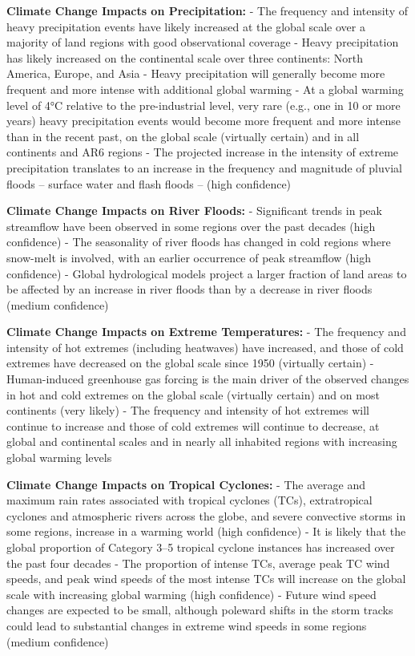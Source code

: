 \documentclass[
  letterpaper,
  DIV=11,
  numbers=noendperiod]{scrreprt}
\begin{document}
\textbf{Climate Change Impacts on Precipitation:} - The frequency and
intensity of heavy precipitation events have likely increased at the
global scale over a majority of land regions with good observational
coverage - Heavy precipitation has likely increased on the continental
scale over three continents: North America, Europe, and Asia - Heavy
precipitation will generally become more frequent and more intense with
additional global warming - At a global warming level of 4°C relative to
the pre-industrial level, very rare (e.g., one in 10 or more years)
heavy precipitation events would become more frequent and more intense
than in the recent past, on the global scale (virtually certain) and in
all continents and AR6 regions - The projected increase in the intensity
of extreme precipitation translates to an increase in the frequency and
magnitude of pluvial floods -- surface water and flash floods -- (high
confidence)

\textbf{Climate Change Impacts on River Floods:} - Significant trends in
peak streamflow have been observed in some regions over the past decades
(high confidence) - The seasonality of river floods has changed in cold
regions where snow-melt is involved, with an earlier occurrence of peak
streamflow (high confidence) - Global hydrological models project a
larger fraction of land areas to be affected by an increase in river
floods than by a decrease in river floods (medium confidence)

\textbf{Climate Change Impacts on Extreme Temperatures:} - The frequency
and intensity of hot extremes (including heatwaves) have increased, and
those of cold extremes have decreased on the global scale since 1950
(virtually certain) - Human-induced greenhouse gas forcing is the main
driver of the observed changes in hot and cold extremes on the global
scale (virtually certain) and on most continents (very likely) - The
frequency and intensity of hot extremes will continue to increase and
those of cold extremes will continue to decrease, at global and
continental scales and in nearly all inhabited regions with increasing
global warming levels

\textbf{Climate Change Impacts on Tropical Cyclones:} - The average and
maximum rain rates associated with tropical cyclones (TCs),
extratropical cyclones and atmospheric rivers across the globe, and
severe convective storms in some regions, increase in a warming world
(high confidence) - It is likely that the global proportion of Category
3--5 tropical cyclone instances has increased over the past four decades
- The proportion of intense TCs, average peak TC wind speeds, and peak
wind speeds of the most intense TCs will increase on the global scale
with increasing global warming (high confidence) - Future wind speed
changes are expected to be small, although poleward shifts in the storm
tracks could lead to substantial changes in extreme wind speeds in some
regions (medium confidence)
\end{document}
